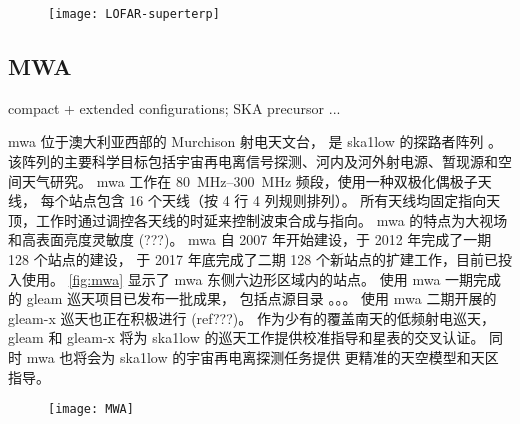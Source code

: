 \begin{figure}[!htb]
  \centering
  \texttt{[image: LOFAR-superterp]}
  \label{fig:lofar}
\end{figure}

\subsection{MWA}

compact + extended configurations; SKA precursor ...

\acf{mwa} 位于澳大利亚西部的 Murchison 射电天文台，
是 \acs{ska1low} 的探路者阵列 \cite{bowman2013,tingay2013}。
该阵列的主要科学目标包括宇宙再电离信号探测、河内及河外射电源、暂现源和空间天气研究。
\acs{mwa} 工作在 \SIrange{80}{300}{\MHz} 频段，使用一种双极化偶极子天线，
每个站点包含 16 个天线（按 4 行 4 列规则排列）。
所有天线均固定指向天顶，工作时通过调控各天线的时延来控制波束合成与指向。
\acs{mwa} 的特点为大视场和高表面亮度灵敏度 (???)。
\acs{mwa} 自 2007 年开始建设，于 2012 年完成了一期 128 个站点的建设，
于 2017 年底完成了二期 128 个新站点的扩建工作，目前已投入使用。
\autoref{fig:mwa} 显示了 \acs{mwa} 东侧六边形区域内的站点。
使用 \acs{mwa} 一期完成的 \ac{gleam} 巡天项目已发布一批成果，
包括点源目录 \cite{hurleyWalker2017}。。。
使用 \acs{mwa} 二期开展的 \ac{gleam-x} 巡天也正在积极进行 (ref???)。
作为少有的覆盖南天的低频射电巡天，\acs{gleam} 和 \acs{gleam-x}
将为 \acs{ska1low} 的巡天工作提供校准指导和星表的交叉认证。
同时 \acs{mwa} 也将会为 \acs{ska1low} 的宇宙再电离探测任务提供
更精准的天空模型和天区指导。

\begin{figure}[!ht]
  \centering
  \texttt{[image: MWA]}
  \label{fig:mwa}
\end{figure}


